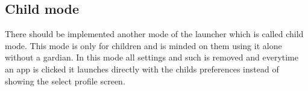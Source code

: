 \subsection*{Child mode}
\label{backlog:child_mode}

There should be implemented another mode of the launcher which is called child mode. This mode is only for children and is minded on them using it alone without a gardian. In this mode all settings and such is removed and everytime an app is clicked it launches directly with the childs preferences instead of showing the select profile screen.
